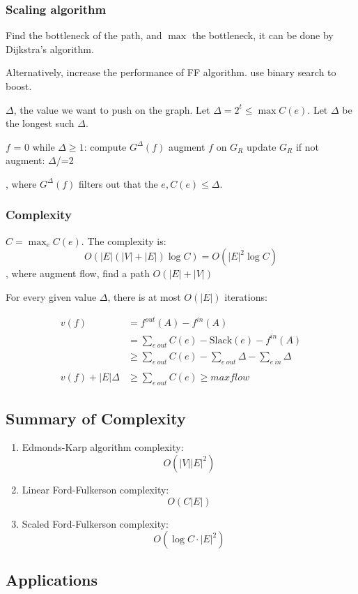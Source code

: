 \documentclass[a4paper]{report}
\theoremstyle{definition}
\begin{document}
\subsubsection{Scaling algorithm}
Find the bottleneck of the path, and $\max$ the bottleneck, it can be done by Dijkstra's algorithm.

Alternatively, increase the performance of FF algorithm. use binary search to boost.

$\Delta$, the value we want to push on the graph. Let $\Delta=2^t \leq \max C(e)$. Let $\Delta$ be the longest such $\Delta$.
\begin{python}[mathescape]
$f$ = 0
while $\Delta\geq 1$:
  compute $G^\Delta(f)$
  augment $f$ on $G_R$
  update $G_R$
  if not augment:
    $\Delta$/=2
\end{python}
, where $G^\Delta(f)$ filters out that the $e, C(e)\leq \Delta$.
\subsubsection{Complexity}
$C = \max_{e}C(e)$. The complexity is:
$$
O(|E|(|V|+|E|)\log C) = O(|E|^2 \log C)
$$
, where augment flow, find a path $O(|E|+|V|)$

For every given value $\Delta$, there is at most $O(|E|)$ iterations:

\begin{align*}
v(f) &= f^{out}(A)-f^{in}(A) \\
&= \sum_{e~out}C(e)-\text{Slack}(e)-f^{in}(A) \\
&\geq \sum_{e~out}C(e)-\sum_{e~out}\Delta-\sum_{e~in}\Delta \\
\\
v(f)+|E|\Delta &\geq \sum_{e~out}C(e) \geq maxflow
\end{align*}

\subsection{Summary of Complexity}
\begin{enumerate}
\item Edmonds-Karp algorithm complexity:
$$
O(|V||E|^2)
$$
\item Linear Ford-Fulkerson complexity:
$$
O(C|E|)
$$
\item Scaled Ford-Fulkerson complexity:
$$
O(\log C \cdot |E|^2)
$$
\end{enumerate}




\subsection{Applications}
\end{document}
